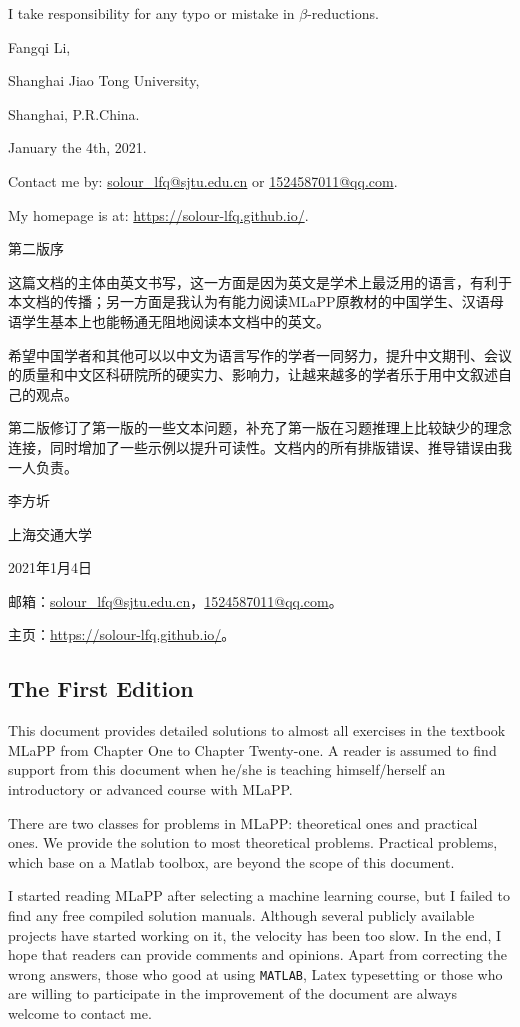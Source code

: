 \documentclass[UTF8]{ctexart}
\begin{document}
I take responsibility for any typo or mistake in $\beta$-reductions.

Fangqi Li,

Shanghai Jiao Tong University,

Shanghai, P.R.China.

January the 4th, 2021.

Contact me by: \url{solour_lfq@sjtu.edu.cn} or \url{1524587011@qq.com}.

My homepage is at: \url{https://solour-lfq.github.io/}.

\newpage
\centerline{\Large{第二版序}}

这篇文档的主体由英文书写，这一方面是因为英文是学术上最泛用的语言，有利于本文档的传播；另一方面是我认为有能力阅读MLaPP原教材的中国学生、汉语母语学生基本上也能畅通无阻地阅读本文档中的英文。

希望中国学者和其他可以以中文为语言写作的学者一同努力，提升中文期刊、会议的质量和中文区科研院所的硬实力、影响力，让越来越多的学者乐于用中文叙述自己的观点。

第二版修订了第一版的一些文本问题，补充了第一版在习题推理上比较缺少的理念连接，同时增加了一些示例以提升可读性。文档内的所有排版错误、推导错误由我一人负责。

李方圻

上海交通大学

2021年1月4日

邮箱：\url{solour_lfq@sjtu.edu.cn}，\url{1524587011@qq.com}。

主页：\url{https://solour-lfq.github.io/}。

\newpage
\subsection{The First Edition}
This document provides detailed solutions to almost all exercises in the textbook MLaPP from Chapter One to Chapter Twenty-one.
A reader is assumed to find support from this document when he/she is teaching himself/herself an introductory or advanced course with MLaPP.

There are two classes for problems in MLaPP: theoretical ones and practical ones.
We provide the solution to most theoretical problems.
Practical problems, which base on a Matlab toolbox, are beyond the scope of this document.

I started reading MLaPP after selecting a machine learning course, but I failed to find any free compiled solution manuals.
Although several publicly available projects have started working on it, the velocity has been too slow.
In the end, I hope that readers can provide comments and opinions. Apart from correcting the wrong answers, those who good at using \texttt{MATLAB}, Latex typesetting or those who are willing to participate in the improvement of the document are always welcome to contact me.
\end{document}
